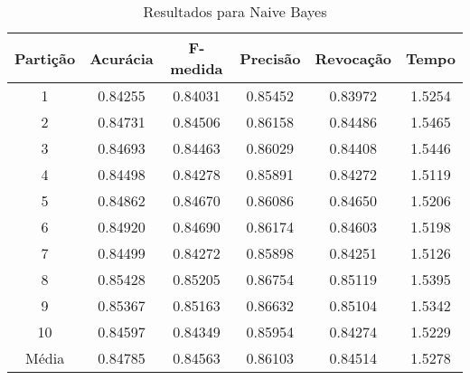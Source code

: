 \begin{table}[h]
\centering
\caption{Resultados para Naive Bayes}
\vspace{0.2cm}
\begin{tabular}{c|c|c|c|c|c}
Partição & Acurácia & F-medida & Precisão & Revocação & Tempo \\
\hline
1  & 0.84255 & 0.84031 & 0.85452 & 0.83972 & 1.5254 \\
2  & 0.84731 & 0.84506 & 0.86158 & 0.84486 & 1.5465 \\
3  & 0.84693 & 0.84463 & 0.86029 & 0.84408 & 1.5446 \\
4  & 0.84498 & 0.84278 & 0.85891 & 0.84272 & 1.5119 \\
5  & 0.84862 & 0.84670 & 0.86086 & 0.84650 & 1.5206 \\
6  & 0.84920 & 0.84690 & 0.86174 & 0.84603 & 1.5198 \\
7  & 0.84499 & 0.84272 & 0.85898 & 0.84251 & 1.5126 \\
8  & 0.85428 & 0.85205 & 0.86754 & 0.85119 & 1.5395 \\
9  & 0.85367 & 0.85163 & 0.86632 & 0.85104 & 1.5342 \\
10 & 0.84597 & 0.84349 & 0.85954 & 0.84274 & 1.5229 \\
\hline
Média & 0.84785 & 0.84563 & 0.86103 & 0.84514 & 1.5278 \\

\end{tabular} 
\label{table:resultadosNB}
\end{table}